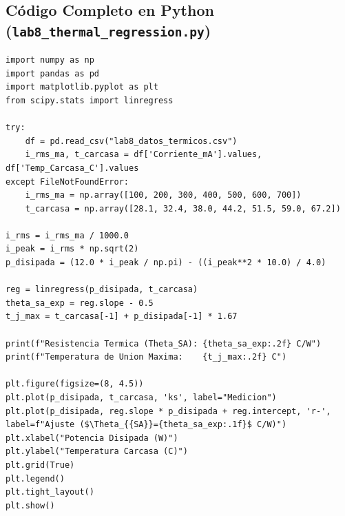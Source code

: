\documentclass[10pt,a4paper,twoside]{article}
\begin{document}
\subsection{Código Completo en Python (\texttt{lab8\_thermal\_regression.py})}
\begin{lstlisting}
import numpy as np
import pandas as pd
import matplotlib.pyplot as plt
from scipy.stats import linregress

try:
    df = pd.read_csv("lab8_datos_termicos.csv")
    i_rms_ma, t_carcasa = df['Corriente_mA'].values, df['Temp_Carcasa_C'].values
except FileNotFoundError:
    i_rms_ma = np.array([100, 200, 300, 400, 500, 600, 700])
    t_carcasa = np.array([28.1, 32.4, 38.0, 44.2, 51.5, 59.0, 67.2])

i_rms = i_rms_ma / 1000.0
i_peak = i_rms * np.sqrt(2)
p_disipada = (12.0 * i_peak / np.pi) - ((i_peak**2 * 10.0) / 4.0)

reg = linregress(p_disipada, t_carcasa)
theta_sa_exp = reg.slope - 0.5
t_j_max = t_carcasa[-1] + p_disipada[-1] * 1.67

print(f"Resistencia Termica (Theta_SA): {theta_sa_exp:.2f} C/W")
print(f"Temperatura de Union Maxima:    {t_j_max:.2f} C")

plt.figure(figsize=(8, 4.5))
plt.plot(p_disipada, t_carcasa, 'ks', label="Medicion")
plt.plot(p_disipada, reg.slope * p_disipada + reg.intercept, 'r-', label=f"Ajuste ($\Theta_{{SA}}={theta_sa_exp:.1f}$ C/W)")
plt.xlabel("Potencia Disipada (W)")
plt.ylabel("Temperatura Carcasa (C)")
plt.grid(True)
plt.legend()
plt.tight_layout()
plt.show()
\end{lstlisting}
\end{document}
